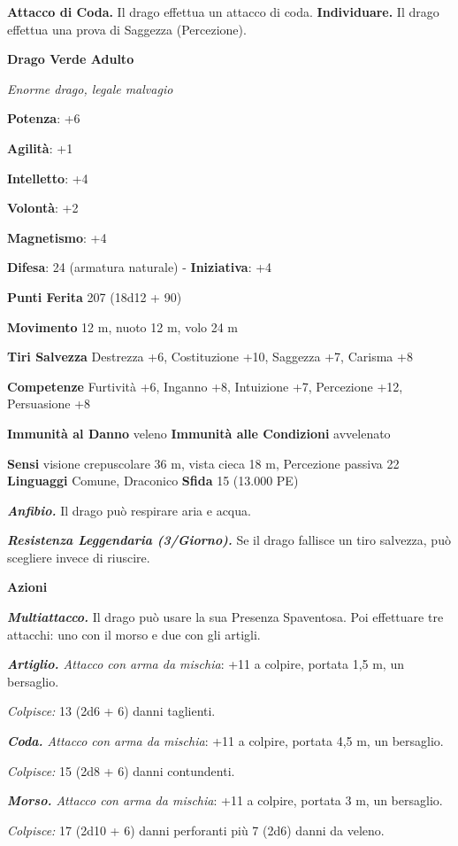 \begin{multicols}{2}
\textbf{Attacco di Coda.} Il drago effettua un attacco di coda.
\textbf{Individuare.} Il drago effettua una prova di Saggezza
(Percezione).

\textbf{Drago Verde Adulto}

\emph{Enorme drago, legale malvagio}

\textbf{Potenza}: +6

\textbf{Agilità}: +1

\textbf{Intelletto}: +4

\textbf{Volontà}: +2

\textbf{Magnetismo}: +4

\textbf{Difesa}: 24 (armatura naturale) - \textbf{Iniziativa}: +4

\textbf{Punti Ferita} 207 (18d12 + 90)

\textbf{Movimento} 12 m, nuoto 12 m, volo 24 m

\textbf{Tiri Salvezza} Destrezza +6, Costituzione +10, Saggezza +7,
Carisma +8

\textbf{Competenze} Furtività +6, Inganno +8, Intuizione +7, Percezione
+12, Persuasione +8

\textbf{Immunità al Danno} veleno \textbf{Immunità alle Condizioni}
avvelenato

\textbf{Sensi} visione crepuscolare 36 m, vista cieca 18 m, Percezione passiva
22 \textbf{Linguaggi} Comune, Draconico \textbf{Sfida} 15 (13.000 PE)

\emph{\textbf{Anfibio.}} Il drago può respirare aria e acqua.

\emph{\textbf{Resistenza Leggendaria (3/Giorno).}} Se il drago fallisce
un tiro salvezza, può scegliere invece di riuscire.

\textbf{Azioni}

\emph{\textbf{Multiattacco.}} Il drago può usare la sua Presenza
Spaventosa. Poi effettuare tre attacchi: uno con il morso e due con gli
artigli.

\emph{\textbf{Artiglio.} Attacco con arma da mischia}: +11 a colpire,
portata 1,5 m, un bersaglio.

\emph{Colpisce:} 13 (2d6 + 6) danni taglienti.

\emph{\textbf{Coda.} Attacco con arma da mischia}: +11 a colpire,
portata 4,5 m, un bersaglio.

\emph{Colpisce:} 15 (2d8 + 6) danni contundenti.

\emph{\textbf{Morso.} Attacco con arma da mischia}: +11 a colpire,
portata 3 m, un bersaglio.

\emph{Colpisce:} 17 (2d10 + 6) danni perforanti più 7 (2d6) danni da
veleno.


\end{multicols}
